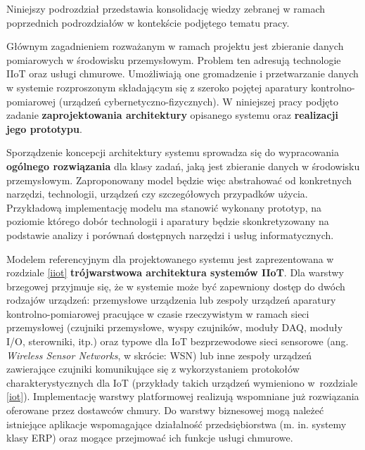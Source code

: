 \documentclass[a4paper, 12pt, twoside]{article}
\begin{document}
Niniejszy podrozdział przedstawia konsolidację wiedzy zebranej w ramach poprzednich
podrozdziałów w kontekście podjętego tematu pracy.

Głównym zagadnieniem rozważanym
w ramach projektu jest zbieranie danych pomiarowych w środowisku
przemysłowym. Problem ten adresują technologie IIoT oraz usługi chmurowe.
Umożliwiają one gromadzenie i przetwarzanie danych w systemie rozproszonym składającym
się z szeroko pojętej aparatury kontrolno-pomiarowej (urządzeń cybernetyczno-fizycznych).
W niniejszej pracy podjęto zadanie \textbf{zaprojektowania architektury} opisanego systemu
oraz \textbf{realizacji jego prototypu}.

Sporządzenie koncepcji architektury systemu sprowadza się do wypracowania
\textbf{ogólnego rozwiązania} dla klasy zadań, jaką jest zbieranie danych w środowisku przemysłowym.
Zaproponowany model będzie więc abstrahować od konkretnych narzędzi, technologii,
urządzeń czy szczegółowych przypadków użycia. Przykładową implementację modelu ma
stanowić wykonany prototyp, na poziomie którego dobór technologii
i aparatury będzie skonkretyzowany na podstawie analizy i porównań dostępnych
narzędzi i usług informatycznych.

Modelem referencyjnym dla projektowanego systemu jest zaprezentowana w rozdziale
\ref{iiot} \textbf{trójwarstwowa architektura systemów IIoT}. Dla warstwy brzegowej przyjmuje
się, że w systemie może być zapewniony dostęp do dwóch rodzajów urządzeń: przemysłowe urządzenia
lub zespoły urządzeń aparatury kontrolno-pomiarowej pracujące w czasie rzeczywistym
w ramach sieci przemysłowej
(czujniki przemysłowe, wyspy czujników, moduły DAQ, moduły I/O, sterowniki, itp.)
oraz typowe dla IoT bezprzewodowe sieci sensorowe (ang. \emph{Wireless Sensor Networks}, w skrócie: WSN)
lub inne zespoły urządzeń zawierające czujniki komunikujące się z wykorzystaniem protokołów charakterystycznych dla IoT
\cite{iiot-gateway-introduction}
(przykłady takich urządzeń wymieniono w~rozdziale \ref{iot}). Implementację warstwy
platformowej realizują wspomniane już rozwiązania oferowane przez dostawców chmury.
Do warstwy biznesowej mogą należeć istniejące aplikacje
wspomagające działalność przedsiębiorstwa
(m. in. systemy klasy ERP) oraz mogące przejmować ich funkcje usługi chmurowe.
\end{document}
